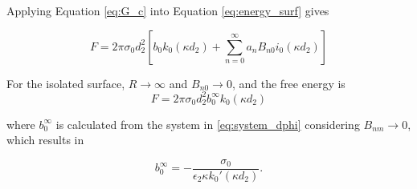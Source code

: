  \noindent Applying Equation \eqref{eq:G_c} into Equation \eqref{eq:energy_surf} gives

\begin{equation} \label{G_c_int}
F = 2\pi \sigma_0 d_2^2 \left[ b_0 k_0(\kappa d_2) + \sum_{n=0}^{\infty} a_n B_{n0} i_0(\kappa d_2) \right]
\end{equation}

 \noindent For the isolated surface, $R \to \infty$ and $B_{n0} \to 0$, and the free energy is 
%
\begin{equation} \label{energy_isolated_dphi}
F = 2\pi \sigma_0 d_2^2 b_0^{\infty} k_0(\kappa d_2) 
\end{equation}
 
 \noindent where $b_0^{\infty}$ is calculated from the system in  \eqref{eq:system_dphi} considering $B_{nm} \to 0$, which results in
 
 \begin{equation} \label{b_inf_dphi}
 b_0^{\infty} = -\frac{\sigma_0}{\epsilon_2 \kappa k_0'(\kappa d_2)}.
 \end{equation}
